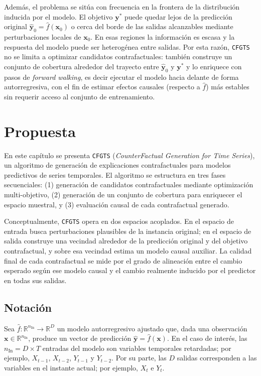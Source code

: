 \documentclass[12pt]{report} %
\begin{document}
Además, el problema se sitúa con frecuencia en la frontera de la distribución inducida por el modelo. El objetivo $\mathbf{y}^{*}$ puede quedar lejos de la predicción original $\hat{\mathbf{y}}_0 = \hat{f}(\mathbf{x}_0)$ o cerca del borde de las salidas alcanzables mediante perturbaciones locales de $\mathbf{x}_0$. En esas regiones la información es escasa y la respuesta del modelo puede ser heterogénea entre salidas. Por esta razón, \texttt{CFGTS} no se limita a optimizar candidatos contrafactuales: también construye un conjunto de cobertura alrededor del trayecto entre $\hat{\mathbf{y}}_0$ y $\mathbf{y}^{*}$ y lo enriquece con pasos de \textit{forward walking}, es decir ejecutar el modelo hacia delante de forma autorregresiva, con el fin de estimar efectos causales (respecto a $\hat{f}$) más estables sin requerir acceso al conjunto de entrenamiento.

\chapter{Propuesta}
\label{cap:propuesta}

En este capítulo se presenta \texttt{CFGTS} (\textit{CounterFactual Generation for Time Series}), un algoritmo de generación de explicaciones contrafactuales para modelos predictivos de series temporales. El algoritmo se estructura en tres fases secuenciales: (1) generación de candidatos contrafactuales mediante optimización multi-objetivo, (2) generación de un conjunto de cobertura para enriquecer el espacio muestral, y (3) evaluación causal de cada contrafactual generado.

Conceptualmente, \texttt{CFGTS} opera en dos espacios acoplados. En el espacio de entrada busca perturbaciones plausibles de la instancia original; en el espacio de salida construye una vecindad alrededor de la predicción original y del objetivo contrafactual, y sobre esa vecindad estima un modelo causal auxiliar. La calidad final de cada contrafactual se mide por el grado de alineación entre el cambio esperado según ese modelo causal y el cambio realmente inducido por el predictor en todas sus salidas.

\section{Notación}

Sea $\hat{f}: \mathbb{R}^{n_{\text{In}}} \rightarrow \mathbb{R}^{D}$ un modelo autorregresivo ajustado que, dada una observación $\mathbf{x} \in \mathbb{R}^{n_{\text{In}}}$, produce un vector de predicción $\hat{\mathbf{y}} = \hat{f}(\mathbf{x})$. En el caso de interés, las $n_{\text{In}} = D \times T$ entradas del modelo son variables temporales retardadas; por ejemplo, $X_{t-1}$, $X_{t-2}$, $Y_{t-1}$ y $Y_{t-2}$. Por su parte, las $D$ salidas corresponden a las variables en el instante actual; por ejemplo, $X_t$ e $Y_t$.
\end{document}

